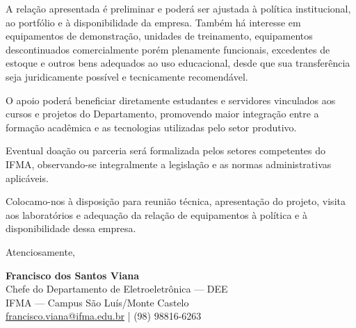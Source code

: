 \documentclass[12pt,a4paper]{article}
\begin{document}
\vspace{4mm}
A relação apresentada é preliminar e poderá ser ajustada à política institucional, ao portfólio e à disponibilidade da empresa. Também há interesse em equipamentos de demonstração, unidades de treinamento, equipamentos descontinuados comercialmente porém plenamente funcionais, excedentes de estoque e outros bens adequados ao uso educacional, desde que sua transferência seja juridicamente possível e tecnicamente recomendável.

O apoio poderá beneficiar diretamente estudantes e servidores vinculados aos cursos e projetos do Departamento, promovendo maior integração entre a formação acadêmica e as tecnologias utilizadas pelo setor produtivo.

Eventual doação ou parceria será formalizada pelos setores competentes do IFMA, observando-se integralmente a legislação e as normas administrativas aplicáveis.

Colocamo-nos à disposição para reunião técnica, apresentação do projeto, visita aos laboratórios e adequação da relação de equipamentos à política e à disponibilidade dessa empresa.

\vspace{7mm}
Atenciosamente,

\vspace{13mm}
\begin{center}
\textbf{Francisco dos Santos Viana}\\[-0.2mm]
{\small Chefe do Departamento de Eletroeletrônica — DEE}\\[-0.2mm]
{\small IFMA — Campus São Luís/Monte Castelo}\\[1mm]
{\footnotesize \href{mailto:francisco.viana@ifma.edu.br}{francisco.viana@ifma.edu.br} \quad | \quad (98) 98816-6263}
\end{center}
\end{document}
